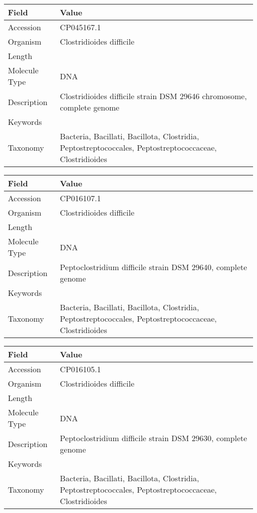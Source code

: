 \documentclass[10pt]{article}
\begin{document}
\vspace{1em}
{\footnotesize
\begin{longtable}{>{\raggedright\arraybackslash}p{4.5cm} >{\raggedright\arraybackslash}p{11.5cm}}
\textbf{Field} & \textbf{Value} \\
\hline
Accession & CP045167.1 \\
Organism & Clostridioides difficile \\
Length & 4261912 \\
Molecule Type & DNA \\
Description & Clostridioides difficile strain DSM 29646 chromosome, complete genome \\
Keywords &  \\
Taxonomy & Bacteria, Bacillati, Bacillota, Clostridia, Peptostreptococcales, Peptostreptococcaceae, Clostridioides \\
\end{longtable}
}

\vspace{1em}
{\footnotesize
\begin{longtable}{>{\raggedright\arraybackslash}p{4.5cm} >{\raggedright\arraybackslash}p{11.5cm}}
\textbf{Field} & \textbf{Value} \\
\hline
Accession & CP016107.1 \\
Organism & Clostridioides difficile \\
Length & 4182534 \\
Molecule Type & DNA \\
Description & Peptoclostridium difficile strain DSM 29640, complete genome \\
Keywords &  \\
Taxonomy & Bacteria, Bacillati, Bacillota, Clostridia, Peptostreptococcales, Peptostreptococcaceae, Clostridioides \\
\end{longtable}
}

\vspace{1em}
{\footnotesize
\begin{longtable}{>{\raggedright\arraybackslash}p{4.5cm} >{\raggedright\arraybackslash}p{11.5cm}}
\textbf{Field} & \textbf{Value} \\
\hline
Accession & CP016105.1 \\
Organism & Clostridioides difficile \\
Length & 4351629 \\
Molecule Type & DNA \\
Description & Peptoclostridium difficile strain DSM 29630, complete genome \\
Keywords &  \\
Taxonomy & Bacteria, Bacillati, Bacillota, Clostridia, Peptostreptococcales, Peptostreptococcaceae, Clostridioides \\
\end{longtable}
}
\end{document}
